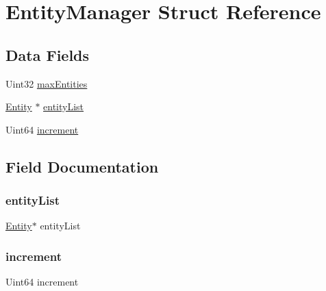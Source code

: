 \hypertarget{struct_entity_manager}{}\section{Entity\+Manager Struct Reference}
\label{struct_entity_manager}
\subsection*{Data Fields}
\begin{DoxyCompactItemize}
\item 
Uint32 \hyperlink{struct_entity_manager_a8c3b6b23ab8d7bd613ded00f7bd3ca9c}{max\+Entities}
\item 
\hyperlink{entity__s_8h_a603076735282b0b83df7e6ecd290f875}{Entity} $\ast$ \hyperlink{struct_entity_manager_ac4bd9b874e2801436da5eaa819b87170}{entity\+List}
\item 
Uint64 \hyperlink{struct_entity_manager_ab08657e2d8ce2eb598d448722ef0959b}{increment}
\end{DoxyCompactItemize}


\subsection{Field Documentation}
\mbox{\label{struct_entity_manager_ac4bd9b874e2801436da5eaa819b87170}} 
\subsubsection{\texorpdfstring{entity\+List}{entityList}}
{\footnotesize\ttfamily \hyperlink{entity__s_8h_a603076735282b0b83df7e6ecd290f875}{Entity}$\ast$ entity\+List}

\mbox{\label{struct_entity_manager_ab08657e2d8ce2eb598d448722ef0959b}} 
\subsubsection{\texorpdfstring{increment}{increment}}
{\footnotesize\ttfamily Uint64 increment}

\mbox{\label{struct_entity_manager_a8c3b6b23ab8d7bd613ded00f7bd3ca9c}} 
